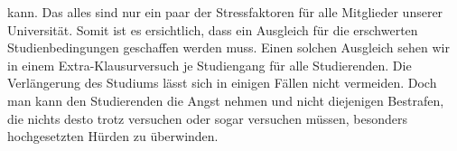 {        kann. Das alles sind nur ein paar der Stressfaktoren für alle Mitglieder unserer
        Universität. Somit ist es ersichtlich, dass ein Ausgleich für die erschwerten
        Studienbedingungen geschaffen werden muss. Einen solchen Ausgleich sehen wir in
        einem Extra-Klausurversuch je Studiengang für alle Studierenden. Die Verlängerung des
        Studiums lässt sich in einigen Fällen nicht vermeiden. Doch man kann den Studierenden
        die Angst nehmen und nicht diejenigen Bestrafen, die nichts desto trotz versuchen oder
        sogar versuchen müssen, besonders hochgesetzten Hürden zu überwinden.
    }{
    }{
    }
